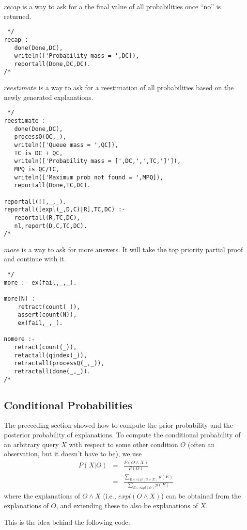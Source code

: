 $recap$ is a way to ask for a the final value of all probabilities
once ``no'' is returned.
\begin{verbatim} */
recap :-
   done(Done,DC),
   writeln(['Probability mass = ',DC]),
   reportall(Done,DC,DC).
/* \end{verbatim}

$reestimate$ is a way to ask for a reestimation of all probabilities
based on the newly generated explanations.
\begin{verbatim} */
reestimate :-
   done(Done,DC),
   processQ(QC,_),
   writeln(['Queue mass = ',QC]),
   TC is DC + QC,
   writeln(['Probability mass = [',DC,',',TC,']']),
   MPQ is QC/TC,
   writeln(['Maximum prob not found = ',MPQ]),
   reportall(Done,TC,DC).

reportall([],_,_).
reportall([expl(_,D,C)|R],TC,DC) :-
   reportall(R,TC,DC),
   nl,report(D,C,TC,DC).
/* \end{verbatim}

$more$ is a way to ask for more answers. It will take the top priority
partial proof and continue with it.
\begin{verbatim} */
more :- ex(fail,_,_).

more(N) :-
    retract(count(_)),
    assert(count(N)),
    ex(fail,_,_).

nomore :- 
   retract(count(_)),
   retactall(qindex(_)),
   retractall(processQ(_,_)),
   retractall(done(_,_)).
/* \end{verbatim}


\subsection{Conditional Probabilities}
The preceeding section showed how to compute the prior probability and
the posterior probability of explanations. To compute the conditional
probability of an arbitrary query $X$ with respect to some other
condition $O$ (often an observation, but it doesn't have to be), we
use
\begin{eqnarray*}
P(X|O) &=& \frac{P(O \wedge X)}{P(O)}\\
&=&\frac{\sum_{E\in expl(O \wedge X)}p(E)}{\sum_{E\in expl(O)}p(E)}
\end{eqnarray*}
where the explanations of $O \wedge X$ (i.e., $expl(O \wedge X)$) can
be obtained from the explanations of $O$, and extending these to also
be explanations of $X$.

This is the idea behind the following code.

